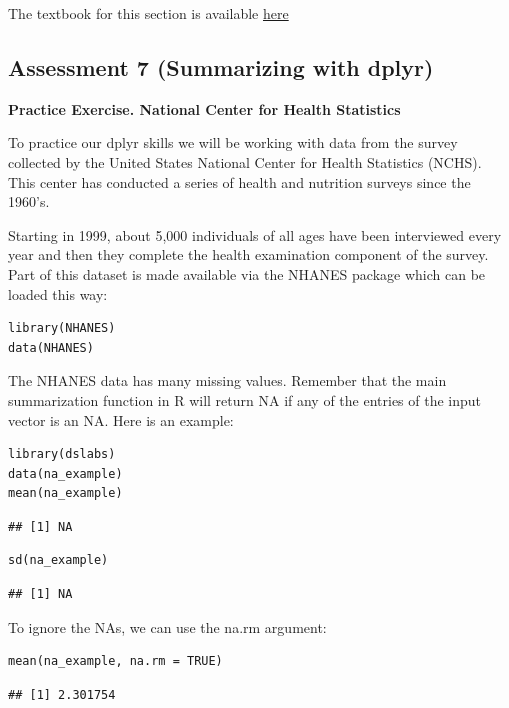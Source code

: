 \documentclass[
]{article}
\begin{document}
The textbook for this section is available
\href{https://rafalab.github.io/dsbook/tidyverse.html\#tidy-data}{here}

\hypertarget{assessment-7-summarizing-with-dplyr}{%
\subsection{Assessment 7 (Summarizing with
dplyr)}\label{assessment-7-summarizing-with-dplyr}}

\textbf{Practice Exercise. National Center for Health Statistics}

To practice our dplyr skills we will be working with data from the
survey collected by the United States National Center for Health
Statistics (NCHS). This center has conducted a series of health and
nutrition surveys since the 1960's.

Starting in 1999, about 5,000 individuals of all ages have been
interviewed every year and then they complete the health examination
component of the survey. Part of this dataset is made available via the
NHANES package which can be loaded this way:

\begin{verbatim}
library(NHANES)
data(NHANES)
\end{verbatim}

The NHANES data has many missing values. Remember that the main
summarization function in R will return NA if any of the entries of the
input vector is an NA. Here is an example:

\begin{verbatim}
library(dslabs)
data(na_example)
mean(na_example)
\end{verbatim}

\begin{verbatim}
## [1] NA
\end{verbatim}

\begin{verbatim}
sd(na_example)
\end{verbatim}

\begin{verbatim}
## [1] NA
\end{verbatim}

To ignore the NAs, we can use the na.rm argument:

\begin{verbatim}
mean(na_example, na.rm = TRUE)
\end{verbatim}

\begin{verbatim}
## [1] 2.301754
\end{verbatim}
\end{document}
